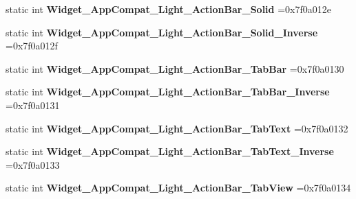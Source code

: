 \begin{DoxyCompactItemize}
static int {\bfseries Widget\+\_\+\+App\+Compat\+\_\+\+Light\+\_\+\+Action\+Bar\+\_\+\+Solid} =0x7f0a012e
\item 
\mbox{\label{classandroid_1_1support_1_1v7_1_1recyclerview_1_1R_1_1style_ae742b5035c35d5867042036ef2cb3ff7}} 
static int {\bfseries Widget\+\_\+\+App\+Compat\+\_\+\+Light\+\_\+\+Action\+Bar\+\_\+\+Solid\+\_\+\+Inverse} =0x7f0a012f
\item 
\mbox{\label{classandroid_1_1support_1_1v7_1_1recyclerview_1_1R_1_1style_a72f2f98fbd2d2f9ac86a940fbc99034e}} 
static int {\bfseries Widget\+\_\+\+App\+Compat\+\_\+\+Light\+\_\+\+Action\+Bar\+\_\+\+Tab\+Bar} =0x7f0a0130
\item 
\mbox{\label{classandroid_1_1support_1_1v7_1_1recyclerview_1_1R_1_1style_a0c194670fd1cacb0dd36d1982790c99f}} 
static int {\bfseries Widget\+\_\+\+App\+Compat\+\_\+\+Light\+\_\+\+Action\+Bar\+\_\+\+Tab\+Bar\+\_\+\+Inverse} =0x7f0a0131
\item 
\mbox{\label{classandroid_1_1support_1_1v7_1_1recyclerview_1_1R_1_1style_ad1226521b79ec0f7b56e3066064dc84c}} 
static int {\bfseries Widget\+\_\+\+App\+Compat\+\_\+\+Light\+\_\+\+Action\+Bar\+\_\+\+Tab\+Text} =0x7f0a0132
\item 
\mbox{\label{classandroid_1_1support_1_1v7_1_1recyclerview_1_1R_1_1style_a05c0884b3343376ccc215d5c7c0eced2}} 
static int {\bfseries Widget\+\_\+\+App\+Compat\+\_\+\+Light\+\_\+\+Action\+Bar\+\_\+\+Tab\+Text\+\_\+\+Inverse} =0x7f0a0133
\item 
\mbox{\label{classandroid_1_1support_1_1v7_1_1recyclerview_1_1R_1_1style_af809fa0024391b2ed8b0518fe198b3e6}} 
static int {\bfseries Widget\+\_\+\+App\+Compat\+\_\+\+Light\+\_\+\+Action\+Bar\+\_\+\+Tab\+View} =0x7f0a0134
\item 
\mbox{\label{classandroid_1_1support_1_1v7_1_1recyclerview_1_1R_1_1style_a965f52e37768b13269e971a418c7d71e}} 

\end{DoxyCompactItemize}

